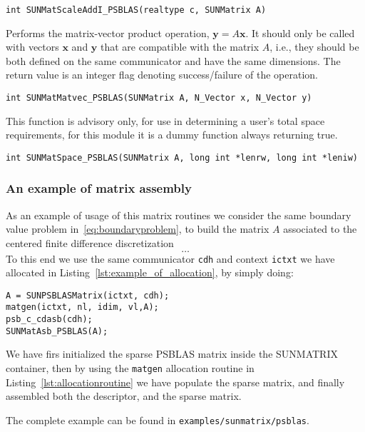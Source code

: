 \documentclass[twoside,a4paper]{refart}
\begin{document}
\begin{description}
 \lstinline[style=CStyle]|int SUNMatScaleAddI_PSBLAS(realtype c, SUNMatrix A)|

\item[\fbox{\texttt{SUNMatMatvec\_PSBLAS}}] Performs the matrix-vector product operation, $\mathbf{y} = A\mathbf{x}$. It should only be
called with vectors $\mathbf{x}$ and $\mathbf{y}$ that are compatible with the matrix $A$, i.e., they should be both defined on the same communicator and have the same dimensions. The return value is an integer flag denoting
success/failure of the operation.

 \lstinline[style=CStyle]|int SUNMatMatvec_PSBLAS(SUNMatrix A, N_Vector x, N_Vector y)|

\item[\fbox{\texttt{SUNMatSpace\_PSBLAS}}] This function is advisory only, for use in determining a user's total space requirements, for this module it is a dummy function always returning true.

 \lstinline[style=CStyle]|int SUNMatSpace_PSBLAS(SUNMatrix A, long int *lenrw, long int *leniw)|
\end{description}

\subsubsection{An example of matrix assembly}

As an example of usage of this matrix routines we consider the same boundary value problem in~\eqref{eq:boundaryproblem}, to build the matrix $A$ associated to the centered finite difference discretization
\begin{equation}
	\ldots
\end{equation}
To this end we use the same communicator \texttt{cdh} and context \texttt{ictxt} we have allocated in Listing~\ref{lst:example_of_allocation}, by simply doing:
\begin{lstlisting}[style=CStyle]
A = SUNPSBLASMatrix(ictxt, cdh);
matgen(ictxt, nl, idim, vl,A);
psb_c_cdasb(cdh);
SUNMatAsb_PSBLAS(A);
\end{lstlisting}
We have firs initialized the sparse PSBLAS matrix inside the SUNMATRIX container, then by using the \texttt{matgen} allocation routine in Listing~\ref{lst:allocationroutine} we have populate the sparse matrix, and finally assembled both the descriptor, and the sparse matrix.

The complete example can be found in \texttt{examples/sunmatrix/psblas}.
\end{document}
